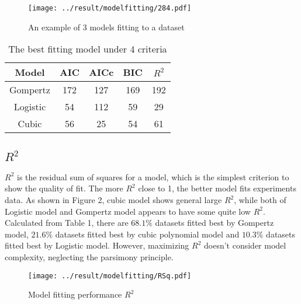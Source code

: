 \documentclass[11pt]{article}
\begin{document}
    \begin{figure}
      \centering
      \texttt{[image: ../result/modelfitting/284.pdf]}
      \caption{An example of 3 models fitting to a dataset}
    \end{figure}

    \begin{table}[htbp]
      \centering
      \caption{The best fitting model under 4 criteria}
      \begin{tabular}{ccccc}
        \hline
        Model & AIC & AICc & BIC & $R^2$ \\ \hline
        Gompertz & 172 & 127 & 169 & 192 \\ \hline
        Logistic & 54 & 112 & 59& 29 \\ \hline
        Cubic & 56 & 25 & 54 & 61 \\ \hline
      \end{tabular}
    \end{table}
  
  \subsection{$R^2$}
    $R^2$ is the residual sum of squares for a model, which is the simplest criterion to show the quality of 
    fit. The more $R^2$ close to 1, the better model fits experiments data. As shown in Figure 2, cubic model 
    shows general large $R^2$, while both of Logistic model and Gompertz model appears to have some quite low 
    $R^2$. Calculated from Table 1, there are $68.1\%$ datasets fitted best by Gompertz model, $21.6\%$ 
    datasets fitted best by cubic polynomial model and $10.3\%$ datasets fitted best by Logistic model. However, 
    maximizing $R^2$ doesn't consider model complexity, neglecting the parsimony principle.
    \begin{figure}
      \centering
      \texttt{[image: ../result/modelfitting/RSq.pdf]}
      \caption{Model fitting performance $R^2$}
    \end{figure}

    
\end{document}
